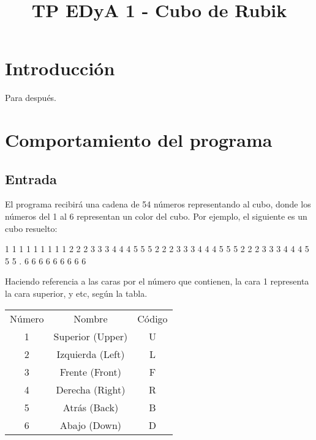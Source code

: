 \documentclass[11pt,twoside,a4paper]{article}
\begin{document}
\title{TP EDyA 1 - Cubo de Rubik}

\maketitle


\section{Introducción}

Para después.

\section{Comportamiento del programa}

\subsection{Entrada}
El programa recibirá una cadena de 54 números representando al cubo, donde los números del 1 al 6 representan un color del cubo. Por ejemplo, el siguiente es un cubo resuelto: \\
\begin{center}
\begin{verbbox}
      1 1 1 
      1 1 1 
      1 1 1 
2 2 2 3 3 3 4 4 4 5 5 5 
2 2 2 3 3 3 4 4 4 5 5 5 
2 2 2 3 3 3 4 4 4 5 5 5           .
      6 6 6 
      6 6 6 
      6 6 6 
\end{verbbox}

\theverbbox
\end{center}

Haciendo referencia a las caras por el número que contienen, la cara 1 representa la cara superior, y etc, según la tabla. \\

\begin{tabular}{c c c}
Número & Nombre & Código \\
1 & Superior (Upper) & U \\
2 & Izquierda (Left) & L \\
3 & Frente (Front) & F \\
4 & Derecha (Right) & R \\
5 & Atrás (Back) & B \\
6 & Abajo (Down) & D \\
\end{tabular}
\end{document}
